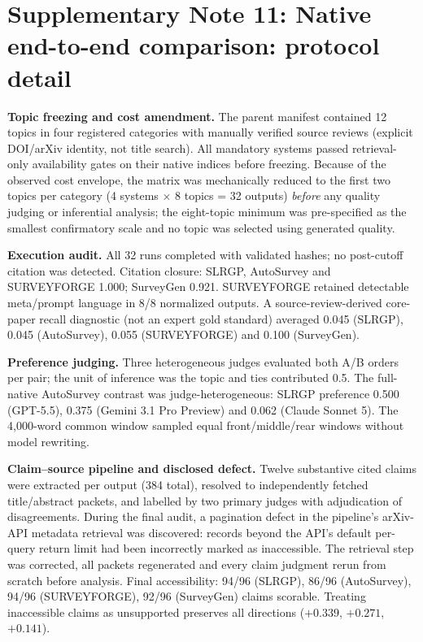 \documentclass[11pt,a4paper]{article}
\newcommand{\snote}[1]{\section*{Supplementary Note #1}}
\begin{document}
\snote{11: Native end-to-end comparison: protocol detail}

\textbf{Topic freezing and cost amendment.} The parent manifest contained 12 topics in four registered categories with manually verified source reviews (explicit DOI/arXiv identity, not title search). All mandatory systems passed retrieval-only availability gates on their native indices before freezing. Because of the observed cost envelope, the matrix was mechanically reduced to the first two topics per category (4 systems $\times$ 8 topics = 32 outputs) \emph{before} any quality judging or inferential analysis; the eight-topic minimum was pre-specified as the smallest confirmatory scale and no topic was selected using generated quality.

\textbf{Execution audit.} All 32 runs completed with validated hashes; no post-cutoff citation was detected. Citation closure: SLRGP, AutoSurvey and SURVEYFORGE 1.000; SurveyGen 0.921. SURVEYFORGE retained detectable meta/prompt language in 8/8 normalized outputs. A source-review-derived core-paper recall diagnostic (not an expert gold standard) averaged 0.045 (SLRGP), 0.045 (AutoSurvey), 0.055 (SURVEYFORGE) and 0.100 (SurveyGen).

\textbf{Preference judging.} Three heterogeneous judges evaluated both A/B orders per pair; the unit of inference was the topic and ties contributed 0.5. The full-native AutoSurvey contrast was judge-heterogeneous: SLRGP preference 0.500 (GPT-5.5), 0.375 (Gemini 3.1 Pro Preview) and 0.062 (Claude Sonnet 5). The 4,000-word common window sampled equal front/middle/rear windows without model rewriting.

\textbf{Claim--source pipeline and disclosed defect.} Twelve substantive cited claims were extracted per output (384 total), resolved to independently fetched title/abstract packets, and labelled by two primary judges with adjudication of disagreements. During the final audit, a pagination defect in the pipeline's arXiv-API metadata retrieval was discovered: records beyond the API's default per-query return limit had been incorrectly marked as inaccessible. The retrieval step was corrected, all packets regenerated and every claim judgment rerun from scratch before analysis. Final accessibility: 94/96 (SLRGP), 86/96 (AutoSurvey), 94/96 (SURVEYFORGE), 92/96 (SurveyGen) claims scorable. Treating inaccessible claims as unsupported preserves all directions ($+0.339$, $+0.271$, $+0.141$).
\end{document}
